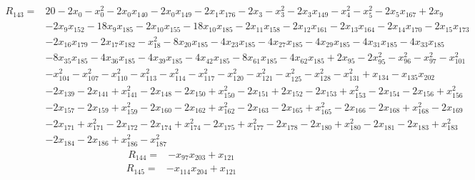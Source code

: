 \begin{align*}
R_{143}={}&20-2x_{0}-x_{0}^{2}-2x_{0}x_{140}-2x_{0}x_{149}-2x_{1}x_{176}-2x_{3}-x_{3}^{2}-2x_{3}x_{149}-x_{4}^{2}-x_{5}^{2}-2x_{5}x_{167}+2x_{9}\\
{}&-2x_{9}x_{152}-18x_{9}x_{185}-2x_{10}x_{155}-18x_{10}x_{185}-2x_{11}x_{158}-2x_{12}x_{161}-2x_{13}x_{164}-2x_{14}x_{170}-2x_{15}x_{173}\\
{}&-2x_{16}x_{179}-2x_{17}x_{182}-x_{18}^{2}-8x_{20}x_{185}-4x_{23}x_{185}-4x_{27}x_{185}-4x_{29}x_{185}-4x_{31}x_{185}-4x_{33}x_{185}\\
{}&-8x_{35}x_{185}-4x_{36}x_{185}-4x_{39}x_{185}-4x_{42}x_{185}-8x_{61}x_{185}-4x_{62}x_{185}+2x_{95}-2x_{95}^{2}-x_{96}^{2}-x_{97}^{2}-x_{101}^{2}\\
{}&-x_{104}^{2}-x_{107}^{2}-x_{110}^{2}-x_{113}^{2}-x_{114}^{2}-x_{117}^{2}-x_{120}^{2}-x_{121}^{2}-x_{125}^{2}-x_{128}^{2}-x_{131}^{2}+x_{134}-x_{135}x_{202}\\
{}&-2x_{139}-2x_{141}+x_{141}^{2}-2x_{148}-2x_{150}+x_{150}^{2}-2x_{151}+2x_{152}-2x_{153}+x_{153}^{2}-2x_{154}-2x_{156}+x_{156}^{2}\\
{}&-2x_{157}-2x_{159}+x_{159}^{2}-2x_{160}-2x_{162}+x_{162}^{2}-2x_{163}-2x_{165}+x_{165}^{2}-2x_{166}-2x_{168}+x_{168}^{2}-2x_{169}\\
{}&-2x_{171}+x_{171}^{2}-2x_{172}-2x_{174}+x_{174}^{2}-2x_{175}+x_{177}^{2}-2x_{178}-2x_{180}+x_{180}^{2}-2x_{181}-2x_{183}+x_{183}^{2}\\
{}&-2x_{184}-2x_{186}+x_{186}^{2}-x_{187}^{2}
\end{align*}
\begin{align*}
R_{144}={}&-x_{97}x_{203}+x_{121}
\end{align*}
\begin{align*}
R_{145}={}&-x_{114}x_{204}+x_{121}
\end{align*}
